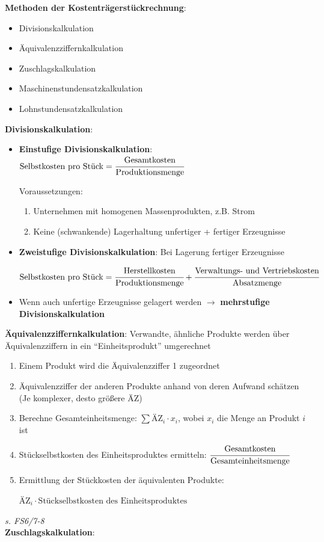 \textbf{Methoden der Kostenträgerstückrechnung}:
\begin{itemize}
	\item Divisionskalkulation
	\item Äquivalenzziffernkalkulation
	\item Zuschlagskalkulation
	\item Maschinenstundensatzkalkulation
	\item Lohnstundensatzkalkulation
\end{itemize}
\bigskip
\textbf{Divisionskalkulation}:
\begin{itemize}
	\item \textbf{Einstufige Divisionskalkulation}: $\text{Selbstkosten pro Stück}=\cfrac{\text{Gesamtkosten}}{\text{Produktionsmenge}}$
	
	Voraussetzungen: 
	\begin{enumerate}
		\item Unternehmen mit homogenen Massenprodukten, z.B. Strom
		\item Keine (schwankende) Lagerhaltung unfertiger + fertiger Erzeugnisse
	\end{enumerate}

	\item \textbf{Zweistufige Divisionskalkulation}: Bei Lagerung fertiger Erzeugnisse
	\begin{tightcenter}
		$\text{Selbstkosten pro Stück}=
		\cfrac{\text{Herstellkosten}}{\text{Produktionsmenge}}+
		\cfrac{\text{Verwaltungs- und Vertriebskosten}}{\text{Absatzmenge}}$
	\end{tightcenter}
	\item Wenn auch unfertige Erzeugnisse gelagert werden $\rightarrow$ \textbf{mehrstufige Divisionskalkulation}
\end{itemize}
\bigskip
\textbf{Äquivalenzziffernkalkulation}: Verwandte, ähnliche Produkte werden über Äquivalenzziffern in ein \enquote{Einheitsprodukt} umgerechnet
\begin{enumerate}
	\item Einem Produkt wird die Äquivalenzziffer 1 zugeordnet
	\item Äquivalenzziffer der anderen Produkte anhand von deren Aufwand schätzen (Je komplexer, desto größere ÄZ)
	\item Berechne Gesamteinheitsmenge: $\sum\text{ÄZ}_i\cdot x_i$, wobei $x_i$ die Menge an Produkt $i$ ist
	\item Stückselbstkosten des Einheitsproduktes ermitteln: $\cfrac{\text{Gesamtkosten}}{\text{Gesamteinheitsmenge}}$
	\item Ermittlung der Stückkosten der äquivalenten Produkte:
	\begin{tightcenter}
		$\text{ÄZ}_i\cdot \text{Stückselbstkosten des Einheitsproduktes}$
	\end{tightcenter}
\end{enumerate}
\textit{s. FS6/7-8}\\

\textbf{Zuschlagskalkulation}: